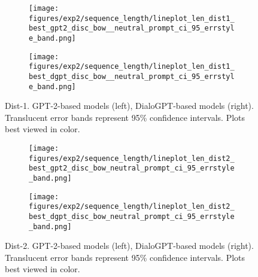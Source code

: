 \begin{figure}[H]
     \centering
     \begin{subfigure}[b]{0.49\textwidth}
        \centering
\texttt{[image: figures/exp2/sequence\_length/lineplot\_len\_dist1\_best\_gpt2\_disc\_bow\_\_neutral\_prompt\_ci\_95\_errstyle\_band.png]}
        \caption{}
        \label{subfig:lineplot_length_dist1_np_gpt2}
     \end{subfigure}
     \hfill
     \begin{subfigure}[b]{0.49\textwidth}
        \centering
        \texttt{[image: figures/exp2/sequence\_length/lineplot\_len\_dist1\_best\_dgpt\_disc\_bow\_\_neutral\_prompt\_ci\_95\_errstyle\_band.png]}
        \caption{}
        \label{subfig:lineplot_length_dist1_np_dgpt}
     \end{subfigure}
        \caption{Dist-1. GPT-2-based models (left), DialoGPT-based models (right). Translucent error bands represent 95\% confidence intervals. Plots best viewed in color.}
        \label{fig:lineplots_length_dist1_np_gpt2_dgpt}
\end{figure}

\begin{figure}[H]
     \centering
     \begin{subfigure}[b]{0.49\textwidth}
        \centering
\texttt{[image: figures/exp2/sequence\_length/lineplot\_len\_dist2\_best\_gpt2\_disc\_bow\_neutral\_prompt\_ci\_95\_errstyle\_band.png]}
        \caption{}
        \label{subfig:lineplot_length_dist2_np_gpt2}
     \end{subfigure}
     \hfill
     \begin{subfigure}[b]{0.49\textwidth}
        \centering
        \texttt{[image: figures/exp2/sequence\_length/lineplot\_len\_dist2\_best\_dgpt\_disc\_bow\_neutral\_prompt\_ci\_95\_errstyle\_band.png]}
        \caption{}
        \label{subfig:lineplot_length_dist2_np_dgpt}
     \end{subfigure}
        \caption{Dist-2. GPT-2-based models (left), DialoGPT-based models (right). Translucent error bands represent 95\% confidence intervals. Plots best viewed in color.}
        \label{fig:lineplots_length_dist2_np_gpt2_dgpt}
\end{figure}

